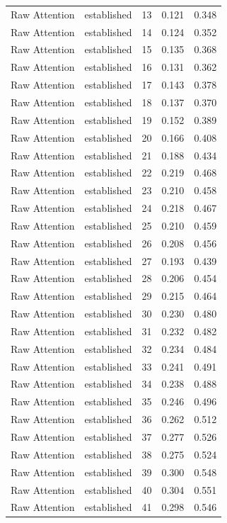 \begin{tabular}{llrrr}
Raw Attention & established & 13 & 0.121 & 0.348 \\
Raw Attention & established & 14 & 0.124 & 0.352 \\
Raw Attention & established & 15 & 0.135 & 0.368 \\
Raw Attention & established & 16 & 0.131 & 0.362 \\
Raw Attention & established & 17 & 0.143 & 0.378 \\
Raw Attention & established & 18 & 0.137 & 0.370 \\
Raw Attention & established & 19 & 0.152 & 0.389 \\
Raw Attention & established & 20 & 0.166 & 0.408 \\
Raw Attention & established & 21 & 0.188 & 0.434 \\
Raw Attention & established & 22 & 0.219 & 0.468 \\
Raw Attention & established & 23 & 0.210 & 0.458 \\
Raw Attention & established & 24 & 0.218 & 0.467 \\
Raw Attention & established & 25 & 0.210 & 0.459 \\
Raw Attention & established & 26 & 0.208 & 0.456 \\
Raw Attention & established & 27 & 0.193 & 0.439 \\
Raw Attention & established & 28 & 0.206 & 0.454 \\
Raw Attention & established & 29 & 0.215 & 0.464 \\
Raw Attention & established & 30 & 0.230 & 0.480 \\
Raw Attention & established & 31 & 0.232 & 0.482 \\
Raw Attention & established & 32 & 0.234 & 0.484 \\
Raw Attention & established & 33 & 0.241 & 0.491 \\
Raw Attention & established & 34 & 0.238 & 0.488 \\
Raw Attention & established & 35 & 0.246 & 0.496 \\
Raw Attention & established & 36 & 0.262 & 0.512 \\
Raw Attention & established & 37 & 0.277 & 0.526 \\
Raw Attention & established & 38 & 0.275 & 0.524 \\
Raw Attention & established & 39 & 0.300 & 0.548 \\
Raw Attention & established & 40 & 0.304 & 0.551 \\
Raw Attention & established & 41 & 0.298 & 0.546 \\

\end{tabular}
